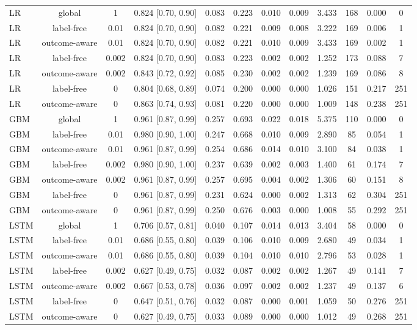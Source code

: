 \documentclass[10pt,onecolumn,letterpaper]{article}
\begin{document}
\begin{table}[!t]
{\begin{tabular}{lccccccccccc}
LR & global & 1 & 0.824 [0.70, 0.90] & 0.083 & 0.223 & 0.010 & 0.009 & 3.433 & 168 & 0.000 & 0 \\
LR & label-free & 0.01 & 0.824 [0.70, 0.90] & 0.082 & 0.221 & 0.009 & 0.008 & 3.222 & 169 & 0.006 & 1 \\
LR & outcome-aware & 0.01 & 0.824 [0.70, 0.90] & 0.082 & 0.221 & 0.010 & 0.009 & 3.433 & 169 & 0.002 & 1 \\
LR & label-free & 0.002 & 0.824 [0.70, 0.90] & 0.083 & 0.223 & 0.002 & 0.002 & 1.252 & 173 & 0.088 & 7 \\
LR & outcome-aware & 0.002 & 0.843 [0.72, 0.92] & 0.085 & 0.230 & 0.002 & 0.002 & 1.239 & 169 & 0.086 & 8 \\
LR & label-free & 0 & 0.804 [0.68, 0.89] & 0.074 & 0.200 & 0.000 & 0.000 & 1.026 & 151 & 0.217 & 251 \\
LR & outcome-aware & 0 & 0.863 [0.74, 0.93] & 0.081 & 0.220 & 0.000 & 0.000 & 1.009 & 148 & 0.238 & 251 \\
GBM & global & 1 & 0.961 [0.87, 0.99] & 0.257 & 0.693 & 0.022 & 0.018 & 5.375 & 110 & 0.000 & 0 \\
GBM & label-free & 0.01 & 0.980 [0.90, 1.00] & 0.247 & 0.668 & 0.010 & 0.009 & 2.890 & 85 & 0.054 & 1 \\
GBM & outcome-aware & 0.01 & 0.961 [0.87, 0.99] & 0.254 & 0.686 & 0.014 & 0.010 & 3.100 & 84 & 0.038 & 1 \\
GBM & label-free & 0.002 & 0.980 [0.90, 1.00] & 0.237 & 0.639 & 0.002 & 0.003 & 1.400 & 61 & 0.174 & 7 \\
GBM & outcome-aware & 0.002 & 0.961 [0.87, 0.99] & 0.257 & 0.695 & 0.004 & 0.002 & 1.306 & 60 & 0.151 & 8 \\
GBM & label-free & 0 & 0.961 [0.87, 0.99] & 0.231 & 0.624 & 0.000 & 0.002 & 1.313 & 62 & 0.304 & 251 \\
GBM & outcome-aware & 0 & 0.961 [0.87, 0.99] & 0.250 & 0.676 & 0.003 & 0.000 & 1.008 & 55 & 0.292 & 251 \\
LSTM & global & 1 & 0.706 [0.57, 0.81] & 0.040 & 0.107 & 0.014 & 0.013 & 3.404 & 58 & 0.000 & 0 \\
LSTM & label-free & 0.01 & 0.686 [0.55, 0.80] & 0.039 & 0.106 & 0.010 & 0.009 & 2.680 & 49 & 0.034 & 1 \\
LSTM & outcome-aware & 0.01 & 0.686 [0.55, 0.80] & 0.039 & 0.104 & 0.010 & 0.010 & 2.796 & 53 & 0.028 & 1 \\
LSTM & label-free & 0.002 & 0.627 [0.49, 0.75] & 0.032 & 0.087 & 0.002 & 0.002 & 1.267 & 49 & 0.141 & 7 \\
LSTM & outcome-aware & 0.002 & 0.667 [0.53, 0.78] & 0.036 & 0.097 & 0.002 & 0.002 & 1.237 & 49 & 0.137 & 6 \\
LSTM & label-free & 0 & 0.647 [0.51, 0.76] & 0.032 & 0.087 & 0.000 & 0.001 & 1.059 & 50 & 0.276 & 251 \\
LSTM & outcome-aware & 0 & 0.627 [0.49, 0.75] & 0.033 & 0.089 & 0.000 & 0.000 & 1.012 & 49 & 0.268 & 251 \\
\bottomrule
\end{tabular}}
\end{table}
\end{document}
